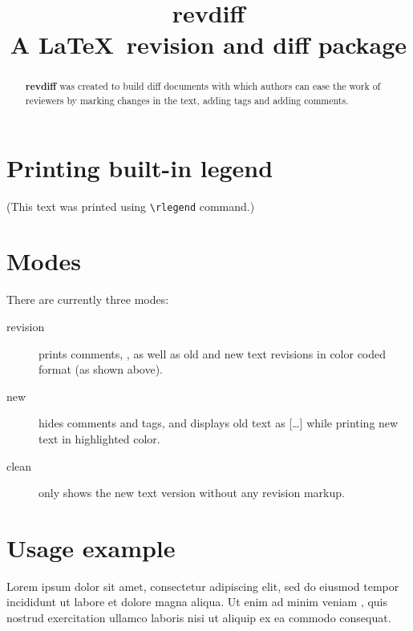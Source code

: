 \documentclass[11pt,onecolumn]{article}
\begin{document}
 

\date{\vspace{-5ex}}
\title{{\huge{\bf revdiff}}\\ A \LaTeX ~revision and diff package}
\maketitle


\begin{abstract}
{\bf revdiff} was created to build diff documents with which authors
can ease the work of reviewers by marking changes in the text, adding
tags and adding comments.
\end{abstract}

\section{Printing built-in legend} 

\rlegend

(This text was printed using {\tt \textbackslash rlegend} command.)

\section{Modes}

There are currently three modes:
\begin{description}
	\item[revision] prints \textcolor{commentcolor}{comments}, \noindent {}, as well as \textcolor{oldcolor}{old} and \textcolor{newcolor}{new} text revisions in color coded format (as shown above).
	\item[new] hides comments and tags, and displays old text as \textcolor{oldcolor}{[\ldots]} while printing \textcolor{newcolor}{new text in highlighted color}.
	\item[clean] only shows the new text version without any revision markup.
\end{description} 

\section{Usage example} 

Lorem ipsum dolor sit amet,  consectetur
adipiscing elit, sed do eiusmod tempor incididunt ut labore et dolore
magna aliqua. Ut enim ad minim veniam , quis
nostrud exercitation ullamco laboris nisi ut aliquip ex ea commodo
consequat.
\end{document}
